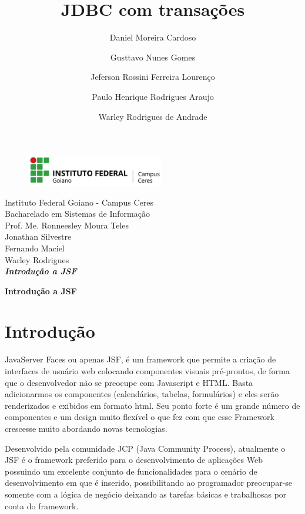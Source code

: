 \documentclass[12pt,a4paper]{article}
\title{JDBC com transações}
\author{Daniel Moreira Cardoso \and Gusttavo Nunes Gomes\and Jeferson Rossini Ferreira Lourenço\and Paulo Henrique Rodrigues Araujo\and Warley Rodrigues de Andrade}
\begin{document}
\begin{titlepage}
\begin{center}
\begin{figure}[htb]
                
                \label{figura:LogoIF}
        
                \centering
                \includegraphics[width=6cm]{recursos/imagens/logo.png} 
\end{figure}
Instituto Federal Goiano - Campus Ceres\\
Bacharelado em Sistemas de Informação\\
Prof. Me. Ronneesley Moura Teles\\\vspace{0.5cm}
Jonathan Silvestre\\
Fernando Maciel\\
Warley Rodrigues\\
\vspace{5.0cm}
\textit{\textbf{\Large{Introdução a JSF}}}\\\vspace{0.5cm}
\vspace{9.5cm}
\end{center}
\end{titlepage}
\tableofcontents
\newpage
\begin{center}
\textbf{\Large{Introdução a JSF}}\\\vspace{0.5cm}
\end{center}

\section{Introdução}
JavaServer Faces ou apenas JSF, é um framework que permite a criação de interfaces de usuário web colocando componentes visuais pré-prontos, de forma que o desenvolvedor não se preocupe com Javascript e HTML. Basta adicionarmos os componentes (calendários, tabelas, formulários) e eles serão renderizados e exibidos em formato html. Seu ponto forte é um grande número de componentes e um design muito flexível o que fez com que esse Framework crescesse muito abordando novas tecnologias.

Desenvolvido pela comunidade JCP (Java Community Process), atualmente o JSF é o framework preferido para o desenvolvimento de aplicações Web possuindo um excelente conjunto de funcionalidades para o cenário de desenvolvimento em que é inserido, possibilitando ao programador preocupar-se somente com a lógica de negócio deixando as tarefas básicas e trabalhosas por conta do framework.
\end{document}
